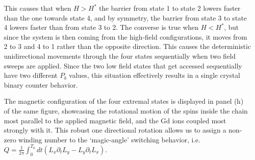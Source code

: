 This causes that when $H > H^*$ the barrier from state 1 to state 2 lowers faster than the one towards state 4, and by symmetry, the barrier from state 3 to state 4 lowers faster than from state 3 to 2.
The converse is true when $H < H^*$, but since the system is then coming from the high-field configurations, it moves from 2 to 3 and 4 to 1 rather than the opposite direction.
This causes the deterministic unidirectional movements through the four states sequentially when two field sweeps are applied.
Since the two low field states that get accessed sequentially have two different $P_b$ values, this situation effectively results in a single crystal binary counter behavior.  

The magnetic configuration of the four extremal states is displayed in panel (h) of the same figure, showcasing the rotational motion of the spins inside the chain most parallel to the applied magnetic field, and the Gd ions coupled most strongly with it.
This robust one directional rotation allows us to assign a non-zero winding number to the `magic-angle' switching behavior, i.e. $Q=\frac{1}{2\pi}\int_0^{T_0} dt (L_x\partial_t L_y - L_y \partial_t L_x)$. 

\begin{figure}[h]
\end{figure}


